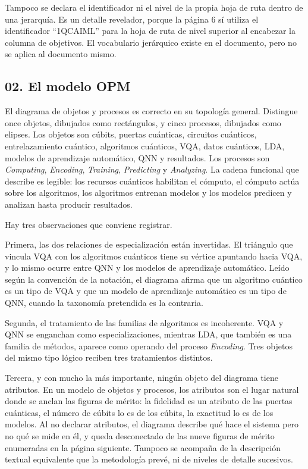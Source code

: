\documentclass[11pt,letterpaper]{article}
\begin{document}
Tampoco se declara el identificador ni el nivel de la propia hoja de ruta
dentro de una jerarquía. Es un detalle revelador, porque la página 6 sí utiliza
el identificador \enquote{1QCAIML} para la hoja de ruta de nivel superior al
encabezar la columna de objetivos. El vocabulario jerárquico existe en el
documento, pero no se aplica al documento mismo.

\subsection*{02. El modelo OPM}

El diagrama de objetos y procesos es correcto en su topología general.
Distingue once objetos, dibujados como rectángulos, y cinco procesos,
dibujados como elipses. Los objetos son cúbits, puertas cuánticas, circuitos
cuánticos, entrelazamiento cuántico, algoritmos cuánticos, VQA, datos
cuánticos, LDA, modelos de aprendizaje automático, QNN y resultados. Los
procesos son \emph{Computing}, \emph{Encoding}, \emph{Training},
\emph{Predicting} y \emph{Analyzing}. La cadena funcional que describe es
legible: los recursos cuánticos habilitan el cómputo, el cómputo actúa sobre
los algoritmos, los algoritmos entrenan modelos y los modelos predicen y
analizan hasta producir resultados.

Hay tres observaciones que conviene registrar.

Primera, las dos relaciones de especialización están invertidas. El triángulo
que vincula VQA con los algoritmos cuánticos tiene su vértice apuntando hacia
VQA, y lo mismo ocurre entre QNN y los modelos de aprendizaje automático. Leído
según la convención de la notación, el diagrama afirma que un algoritmo
cuántico es un tipo de VQA y que un modelo de aprendizaje automático es un tipo
de QNN, cuando la taxonomía pretendida es la contraria.

Segunda, el tratamiento de las familias de algoritmos es incoherente. VQA y QNN
se enganchan como especializaciones, mientras LDA, que también es una familia
de métodos, aparece como operando del proceso \emph{Encoding}. Tres objetos del
mismo tipo lógico reciben tres tratamientos distintos.

Tercera, y con mucho la más importante, ningún objeto del diagrama tiene
atributos. En un modelo de objetos y procesos, los atributos son el lugar
natural donde se anclan las figuras de mérito: la fidelidad es un atributo de
las puertas cuánticas, el número de cúbits lo es de los cúbits, la exactitud lo
es de los modelos. Al no declarar atributos, el diagrama describe qué hace el
sistema pero no qué se mide en él, y queda desconectado de las nueve figuras de
mérito enumeradas en la página siguiente. Tampoco se acompaña de la
descripción textual equivalente que la metodología prevé, ni de niveles de
detalle sucesivos.
\end{document}
